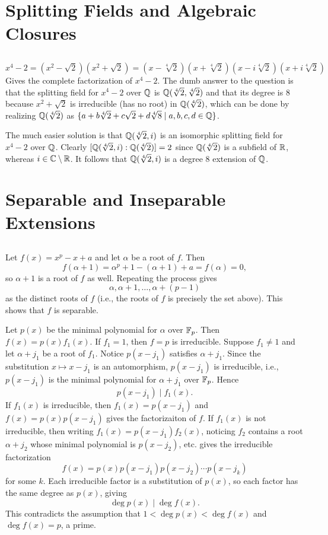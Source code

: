 \documentclass[12pt]{article}
\begin{document}
\setcounter{section}{3}
\section{Splitting Fields and Algebraic Closures} 
\subsection{} 
$$x^4 - 2 = (x^2 - \sqrt{2})(x^2 + \sqrt{2}) = (x - \sqrt[4]{2})(x + \sqrt[4]{2})(x - i\sqrt[4]{2})(x + i\sqrt[4]{2})$$
Gives the complete factorization of $x^4 - 2$. 
The dumb answer to the question is that the splitting field for $x^4 - 2$ over $\mathbb{Q}$ is $\mathbb{Q}(\sqrt[4]{2}, \sqrt[4]{2})$ and that its degree is 8 because $x^2 + \sqrt{2}$ is irreducible (has no root) in $\mathbb{Q}(\sqrt[4]{2})$, which can be done by realizing $\mathbb{Q}(\sqrt[4]{2})$ as $\{a + b\sqrt[4]{2} + c\sqrt{2} + d\sqrt[4]{8} \mid a, b, c, d \in \mathbb{Q}\}$. 

The much easier solution is that $\mathbb{Q}(\sqrt[4]{2}, i)$ is an isomorphic splitting field for $x^4 - 2$ over $\mathbb{Q}$. 
Clearly $[\mathbb{Q}(\sqrt[4]{2}, i) : \mathbb{Q}(\sqrt[4]{2})] = 2$ since $\mathbb{Q}(\sqrt[4]{2})$ is a subfield of $\mathbb{R}$, whereas $i \in \mathbb{C} \setminus \mathbb{R}$. 
It follows that $\mathbb{Q}(\sqrt[4]{2}, i)$ is a degree 8 extension of $\mathbb{Q}$.  

\section{Separable and Inseparable Extensions} 
\setcounter{subsection}{3} 
\subsection{} 
Let $f(x) = x^p - x + a$ and let $\alpha$ be a root of $f$. 
Then 
$$f(\alpha + 1) = \alpha^p + 1 - (\alpha + 1) + a = f(\alpha) = 0,$$
so $\alpha + 1$ is a root of $f$ as well. 
Repeating the process gives 
$$\alpha, \alpha + 1, \ldots, \alpha + (p - 1)$$
as the distinct roots of $f$ (i.e., the roots of $f$ is precisely the set above). 
This shows that $f$ is separable. 

Let $p(x)$ be the minimal polynomial for $\alpha$ over $\mathbb{F}_p$. 
Then $f(x) = p(x) f_1(x)$. 
If $f_1 = 1$, then $f = p$ is irreducible. 
Suppose $f_1 \neq 1$ and let $\alpha + j_1$ be a root of $f_1$. 
Notice $p(x - j_1)$ satisfies $\alpha + j_1$. 
Since the substitution $x \mapsto x - j_1$ is an automorphism, $p(x - j_1)$ is irreducible, i.e., 
$p(x - j_1)$ is the minimal polynomial for $\alpha + j_1$ over $\mathbb{F}_p$. 
Hence 
$$p(x - j_1) \mid f_1(x).$$
If $f_1(x)$ is irreducible, then $f_1(x) = p(x - j_1)$ and $f(x) = p(x) p(x - j_1)$ gives the factorizaiton of $f$. 
If $f_1(x)$ is not irreducible, then writing $f_1(x) = p(x - j_1)f_2(x)$, noticing $f_2$ contains a root $\alpha + j_2$ whose minimal polynomial is $p(x - j_2)$, etc. 
gives the irreducible factorization 
$$f(x) = p(x) p(x - j_1) p(x - j_2) \cdots p(x - j_k)$$
for some $k$. 
Each irreducible factor is a substitution of $p(x)$, so each factor has the same degree as $p(x)$, giving 
$$\deg{p(x)} \mid \deg{f(x)}.$$
This contradicts the assumption that $1 < \deg{p(x)} < \deg{f(x)}$ and $\deg{f(x)} = p$, a prime. 
\end{document}
